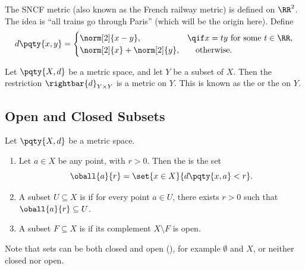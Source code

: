 \begin{example}
    The SNCF metric (also known as the French railway metric) is defined on \(\RR^2\). The idea is ``all trains go through Paris'' (which will be the origin here). Define
    \[
        d\pqty{x, y} = \begin{cases}
            \norm[2]{x - y}, & \qif x = ty \text{ for some }t \in \RR,\\
            \norm[2]{x} + \norm[2]{y}, & \quad\text{otherwise}.
        \end{cases}
    \]
\end{example}

\begin{definition}
    Let \(\pqty{X, d}\) be a metric space, and let \(Y\) be a subset of \(X\). Then the restriction \(\rightbar{d}_{Y \times Y}\) is a metric on \(Y\). This is known as the  or the  on \(Y\).
\end{definition}

\subsection{Open and Closed Subsets}

\begin{definition}
    \label{def:open-and-closed-subsets}%
    Let \(\pqty{X, d}\) be a metric space.
    \begin{enumerate}[label=(\roman*)]
        \item Let \(a \in X\) be any point, with \(r > 0\). Then the  is the set
        \[
            \oball{a}{r} = \set{x \in X}{d\pqty{x, a} < r}.
        \]

        \item A subset \(U \subseteq X\) is  if for every point \(a \in U\), there exists \(r > 0\) such that \(\oball{a}{r} \subseteq U\).
        \item A subset \(F \subseteq X\) is  if its complement \(X \setminus F\) is open.
    \end{enumerate}
\end{definition}

\begin{remark}
    Note that sets can be both closed and open (), for example \(\emptyset\) and \(X\), or neither closed nor open.
\end{remark}

